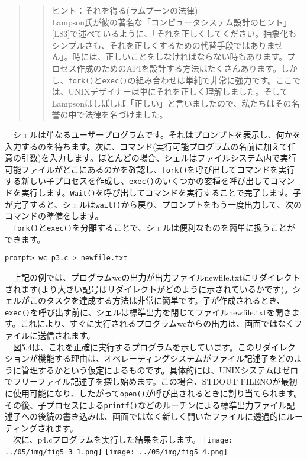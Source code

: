 \begin{quote}
\begin{quote}
ヒント：それを得る(ラムプーンの法律)\\
Lampson氏が彼の著名な「コンピュータシステム設計のヒント」{[}L83{]}で述べているように、「それを正しくしてください。抽象化もシンプルさも、それを正しくするための代替手段ではありません」。時には、正しいことをしなければならない時もあります。プロセス作成のためのAPIを設計する方法はたくさんあります。しかし、\texttt{fork()}と\texttt{exec()}の組み合わせは単純で非常に強力です。ここでは、UNIXデザイナーは単にそれを正しく理解しました。そしてLampsonはしばしば「正しい」と言いましたので、私たちはその名誉の中で法律を名づけました。
\end{quote}
\end{quote}

　シェルは単なるユーザープログラムです。それはプロンプトを表示し、何かを入力するのを待ちます。次に、コマンド(実行可能プログラムの名前に加えて任意の引数)を入力します。ほとんどの場合、シェルはファイルシステム内で実行可能ファイルがどこにあるのかを確認し、\texttt{fork()}を呼び出してコマンドを実行する新しい子プロセスを作成し、\texttt{exec()}のいくつかの変種を呼び出してコマンドを実行します。\texttt{Wait()}を呼び出してコマンドを実行することで完了します。子が完了すると、シェルは\texttt{wait()}から戻り、プロンプトをもう一度出力して、次のコマンドの準備をします。\\
　\texttt{fork()}と\texttt{exec()}を分離することで、シェルは便利なものを簡単に扱うことができます。

\begin{verbatim}
prompt> wc p3.c > newfile.txt
\end{verbatim}

　上記の例では、プログラムwcの出力が出力ファイルnewfile.txtにリダイレクトされます(より大きい記号はリダイレクトがどのように示されているかです)。シェルがこのタスクを達成する方法は非常に簡単です。子が作成されるとき、\texttt{exec()}を呼び出す前に、シェルは標準出力を閉じてファイルnewfile.txtを開きます。これにより、すぐに実行されるプログラムwcからの出力は、画面ではなくファイルに送信されます。\\
　図5.4は、これを正確に実行するプログラムを示しています。このリダイレクションが機能する理由は、オペレーティングシステムがファイル記述子をどのように管理するかという仮定によるものです。具体的には、UNIXシステムはゼロでフリーファイル記述子を探し始めます。この場合、STDOUT
FILENOが最初に使用可能になり、したがって\texttt{open()}が呼び出されるときに割り当てられます。その後、子プロセスによる\texttt{printf()}などのルーチンによる標準出力ファイル記述子への後続の書き込みは、画面ではなく新しく開いたファイルに透過的にルーティングされます。\\
　次に、p4.cプログラムを実行した結果を示します。
\texttt{[image: ../05/img/fig5\_3\_1.png]}
\texttt{[image: ../05/img/fig5\_4.png]}

